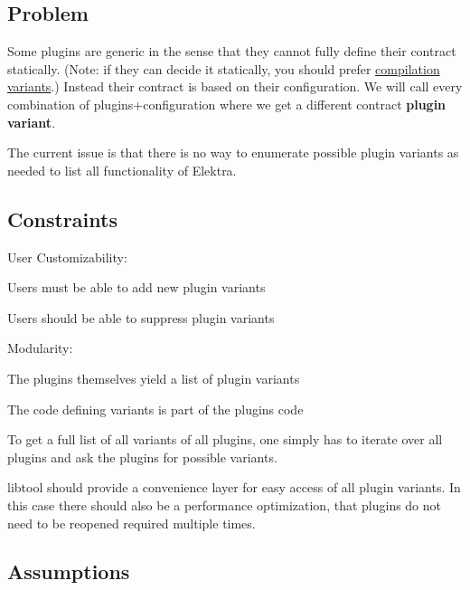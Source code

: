 \subsection*{Problem}

Some plugins are generic in the sense that they cannot fully define their contract statically. (Note\+: if they can decide it statically, you should prefer \hyperlink{doc_tutorials_compilation-variants_md}{compilation variants}.) Instead their contract is based on their configuration. We will call every combination of plugins+configuration where we get a different contract {\bfseries plugin variant}.

The current issue is that there is no way to enumerate possible plugin variants as needed to list all functionality of Elektra.

\subsection*{Constraints}


\begin{DoxyItemize}
\item User Customizability\+:
\begin{DoxyItemize}
\item Users must be able to add new plugin variants
\item Users should be able to suppress plugin variants
\end{DoxyItemize}
\item Modularity\+:
\begin{DoxyItemize}
\item The plugins themselves yield a list of plugin variants
\item The code defining variants is part of the plugin\textquotesingle{}s code
\item To get a full list of all variants of all plugins, one simply has to iterate over all plugins and ask the plugins for possible variants.
\end{DoxyItemize}
\item libtool should provide a convenience layer for easy access of all plugin variants. In this case there should also be a performance optimization, that plugins do not need to be reopened required multiple times.
\end{DoxyItemize}

\subsection*{Assumptions}


